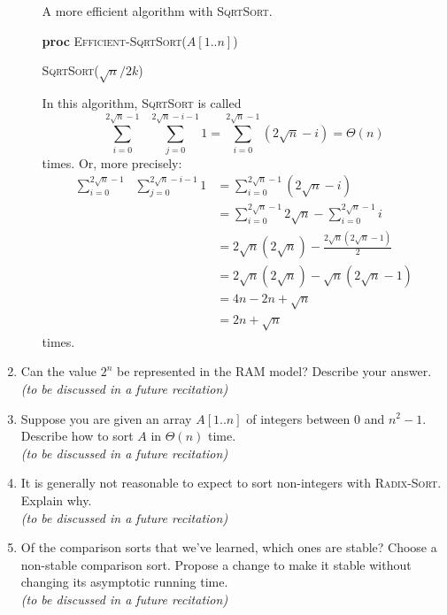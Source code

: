 \documentclass[letterpaper,11pt]{article}
\begin{document}
\begin{enumerate}
\begin{enumerate}
\begin{algorithm}[!htb]
\caption{A more efficient algorithm with \textsc{SqrtSort}.}
{\bf proc} \textsc{Efficient-SqrtSort}($A[1..n]$)
\begin{algorithmic}[1]
\State    \textsc{SqrtSort}($\sqrt{n}/2k$)
\EndFor
\EndFor
\end{algorithmic}
\label{algorithm:better-sqrtsort}
\end{algorithm}

In this algorithm, \textsc{SqrtSort} is called
\[\sum_{i=0}^{2\sqrt{n}-1}\,\,\,\,\sum_{j=0}^{2\sqrt{n}-i-1}1 = \sum_{i=0}^{2\sqrt{n}-1}(2\sqrt{n}-i) = \Theta(n)\]
times. Or, more precisely:
\begin{align*}
\sum_{i=0}^{2\sqrt{n}-1}\,\,\,\,\sum_{j=0}^{2\sqrt{n}-i-1}1 &= \sum_{i=0}^{2\sqrt{n}-1}(2\sqrt{n}-i)\\
&= \sum_{i=0}^{2\sqrt{n}-1}2\sqrt{n}-\sum_{i=0}^{2\sqrt{n}-1}i\\
&= 2\sqrt{n}(2\sqrt{n})-\frac{2\sqrt{n}(2\sqrt{n}-1)}{2}\\
& = 2\sqrt{n}(2\sqrt{n}) - \sqrt{n}(2\sqrt{n}-1)\\
&= 4n - 2n + \sqrt{n}\\
&= 2n + \sqrt{n}
\end{align*}
times.

\end{enumerate}

\newpage

\item Can the value $2^n$ be represented in the RAM model? Describe your answer.\\
\emph{(to be discussed in a future recitation)}
\vspace*{4cm}

\item Suppose you are given an array $A[1..n]$ of integers between $0$ and $n^2-1$. Describe how to sort $A$ in $\Theta(n)$ time.\\
\emph{(to be discussed in a future recitation)}
\vspace*{4cm}

\item It is generally not reasonable to expect to sort non-integers with \textsc{Radix-Sort}. Explain why.\\
\emph{(to be discussed in a future recitation)}
\vspace*{4cm}

\item Of the comparison sorts that we've learned, which ones are stable? Choose a non-stable comparison sort. Propose a change to make it stable without changing its asymptotic running time.\\
\emph{(to be discussed in a future recitation)}
\vspace*{4cm}
\newpage


\end{enumerate}
\end{document}
